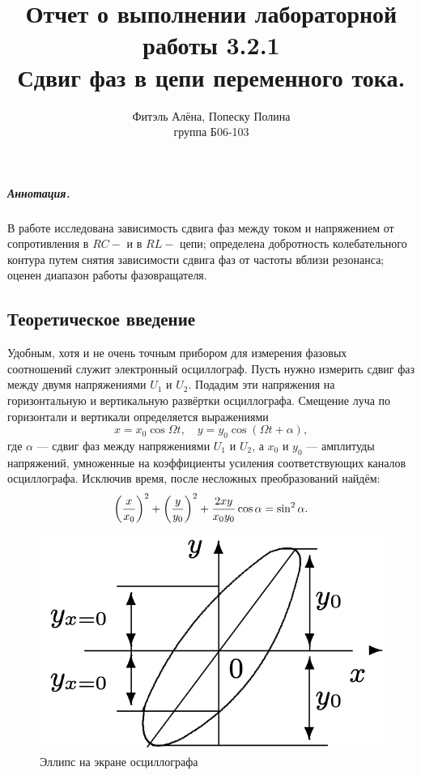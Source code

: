 \documentclass[12pt,a4paper]{article}
\title{
Отчет о выполнении лабораторной работы 3.2.1 \\
Сдвиг фаз в цепи переменного тока.}
\author{Фитэль Алёна, Попеску Полина\\ группа Б06-103}
\begin{document}
\maketitle

\subparagraph*{Аннотация.} В работе исследована зависимость сдвига фаз между током и напряжением от сопротивления в $RC -$ и в $RL - $ цепи;
определена добротность колебательного контура путем снятия зависимости сдвига фаз от частоты вблизи резонанса; 
оценен диапазон работы фазовращателя.

\subsection*{Теоретическое введение}

Удобным, хотя и не очень точным прибором для измерения фазовых соотношений служит электронный осциллограф. 
Пусть нужно измерить сдвиг фаз между двумя напряжениями $U_1$ и $U_2$. 
Подадим эти напряжения на горизонтальную и вертикальную развёртки осциллографа. 
Смещение луча по горизонтали и вертикали определяется выражениями $$x = x_0 \cos \Omega t,\quad y = y_0 \cos (\Omega t + \alpha),$$ где $\alpha$ — сдвиг фаз между напряжениями $U_1$ и $U_2$, а $x_0$ и $y_0$ — амплитуды напряжений, умноженные на коэффициенты усиления соответствующих каналов осциллографа. 
Исключив время, после несложных преобразований найдём:
\begin{equation*}
    \left( {x \over x_0}\right)^2 + \left( {y \over y_0}\right)^2 + {2xy \over x_0y_0} \cos \alpha = \sin^2 \alpha.
\end{equation*}
\hfill
\begin{figure}
    \includegraphics[width=\linewidth]{ellipse.png}
    \caption{Эллипс на экране осциллографа}
\end{figure}
\end{document}
